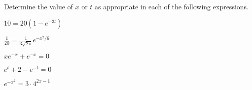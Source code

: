 \begin{problem}
\item Determine the value of $x$ or $t$ as appropriate in each of the
  following expressions.
  \begin{subproblem}
  \item $10 = 20\left( 1 - e^{-3t} \right)$
    \vfill
  \item $\frac{1}{20} =  \frac{1}{3\sqrt{2\pi}} e^{-x^2/6}$
    \vfill
  \item $xe^{-x} + e^{-x} = 0$
    \vfill
    \clearpage
  \item $e^{t} + 2 - e^{-t} = 0$
    \vfill
  \item $e^{-x^2} = 3\cdot 4^{2x-1}$
    \vfill
  \end{subproblem}

  \clearpage


\end{problem}
